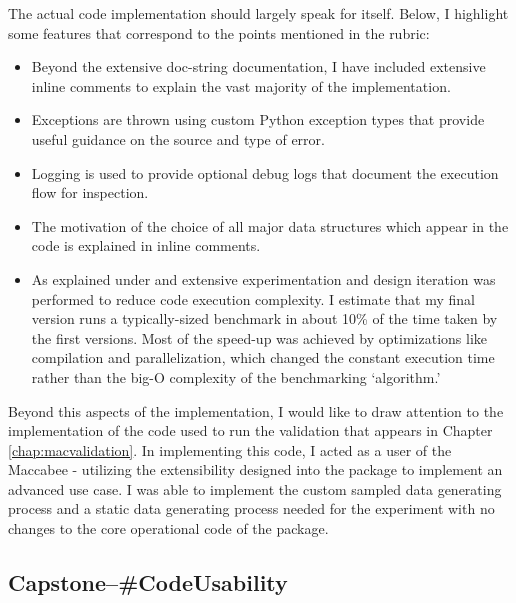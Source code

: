 \documentclass[../main.tex]{subfiles}
\begin{document}
The actual code implementation should largely speak for itself. Below, I highlight some features that correspond to the points mentioned in the rubric:

\begin{itemize}
    \item Beyond the extensive doc-string documentation, I have included extensive inline comments to explain the vast majority of the implementation.
    
    \item Exceptions are thrown using custom Python exception types that provide useful guidance on the source and type of error.
    
    \item Logging is used to provide optional debug logs that document the execution flow for inspection.
    
    \item The motivation of the choice of all major data structures which appear in the code is explained in inline comments.
    
    \item As explained under  and  extensive experimentation and design iteration was performed to reduce code execution complexity. I estimate that my final version runs a typically-sized benchmark in about 10\% of the time taken by the first versions. Most of the speed-up was achieved by optimizations like compilation and parallelization, which changed the constant execution time rather than the big-O complexity of the benchmarking `algorithm.'
\end{itemize}

Beyond this aspects of the implementation, I would like to draw attention to the implementation of the code used to run the validation that appears in Chapter \ref{chap:macvalidation}. In implementing this code, I acted as a user of the Maccabee - utilizing the extensibility designed into the package to implement an advanced use case. I was able to implement the custom sampled data generating process and a static data generating process needed for the experiment with no changes to the core operational code of the package.


\subsection*{\textbf{Capstone--\#CodeUsability}}
\label{lo:CodeUsability}
\end{document}
